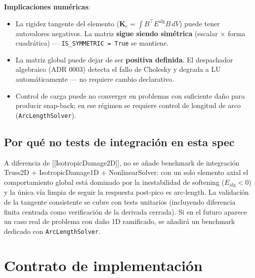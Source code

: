 \documentclass[11pt,letterpaper,oneside]{report}
\begin{document}
\textbf{Implicaciones numéricas}:

\begin{itemize}
  \item La rigidez tangente del elemento ($\mathbf K_e = \int B^\top E^\text{alg} B\, dV$) puede tener autovalores negativos. La matriz \textbf{sigue siendo simétrica} (escalar \ensuremath{\times} forma cuadrática) --- \texttt{IS\_SYMMETRIC = True} se mantiene.
  \item La matriz global puede dejar de ser \textbf{positiva definida}. El despachador algebraico (ADR 0003) detecta el fallo de Cholesky y degrada a LU automáticamente --- no requiere cambio declarativo.
  \item Control de carga puede no converger en problemas con suficiente daño para producir snap-back; en ese régimen se requiere control de longitud de arco (\texttt{ArcLengthSolver}).
\end{itemize}

\subsection{Por qué no tests de integración en esta spec}

A diferencia de [[IsotropicDamage2D]], no se añade benchmark de integración Truss2D + IsotropicDamage1D + NonlinearSolver: con un solo elemento axial el comportamiento global está dominado por la inestabilidad de softening ($E_{\text{alg}} < 0$) y la única vía limpia de seguir la respuesta post-pico es arc-length. La validación de la tangente consistente se cubre con tests unitarios (incluyendo diferencia finita centrada como verificación de la derivada cerrada). Si en el futuro aparece un caso real de problema con daño 1D ramificado, se añadirá un benchmark dedicado con \texttt{ArcLengthSolver}.


\section{Contrato de implementación}
\end{document}
